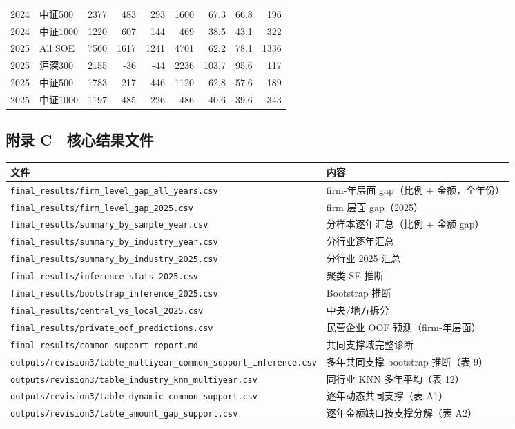 \documentclass[11pt,a4paper]{ctexart}
\begin{document}
\begin{table}[H]
{\begin{tabular}{llrrrrrrr}
2024 & 中证500 & 2377 & 483 & 293 & 1600 & 67.3 & 66.8 & 196 \\
2024 & 中证1000 & 1220 & 607 & 144 & 469 & 38.5 & 43.1 & 322 \\
2025 & All SOE & 7560 & 1617 & 1241 & 4701 & 62.2 & 78.1 & 1336 \\
2025 & 沪深300 & 2155 & -36 & -44 & 2236 & 103.7 & 95.6 & 117 \\
2025 & 中证500 & 1783 & 217 & 446 & 1120 & 62.8 & 57.6 & 189 \\
2025 & 中证1000 & 1197 & 485 & 226 & 486 & 40.6 & 39.6 & 343 \\
\bottomrule
\end{tabular}}
\end{table}

\subsection{附录 C　核心结果文件}

\begin{center}
\centering
\small
\begin{tabular}{ll}
\toprule
文件 & 内容 \\
\midrule
\texttt{final\_results/firm\_level\_gap\_all\_years.csv} & firm-年层面 gap（比例 + 金额，全年份） \\
\texttt{final\_results/firm\_level\_gap\_2025.csv} & firm 层面 gap（2025） \\
\texttt{final\_results/summary\_by\_sample\_year.csv} & 分样本逐年汇总（比例 + 金额 gap） \\
\texttt{final\_results/summary\_by\_industry\_year.csv} & 分行业逐年汇总 \\
\texttt{final\_results/summary\_by\_industry\_2025.csv} & 分行业 2025 汇总 \\
\texttt{final\_results/inference\_stats\_2025.csv} & 聚类 SE 推断 \\
\texttt{final\_results/bootstrap\_inference\_2025.csv} & Bootstrap 推断 \\
\texttt{final\_results/central\_vs\_local\_2025.csv} & 中央/地方拆分 \\
\texttt{final\_results/private\_oof\_predictions.csv} & 民营企业 OOF 预测（firm-年层面） \\
\texttt{final\_results/common\_support\_report.md} & 共同支撑域完整诊断 \\
\texttt{outputs/revision3/table\_multiyear\_common\_support\_inference.csv} & 多年共同支撑 bootstrap 推断（表 9） \\
\texttt{outputs/revision3/table\_industry\_knn\_multiyear.csv} & 同行业 KNN 多年平均（表 12） \\
\texttt{outputs/revision3/table\_dynamic\_common\_support.csv} & 逐年动态共同支撑（表 A1） \\
\texttt{outputs/revision3/table\_amount\_gap\_support.csv} & 逐年金额缺口按支撑分解（表 A2） \\
\bottomrule
\end{tabular}
\end{center}
\end{document}
